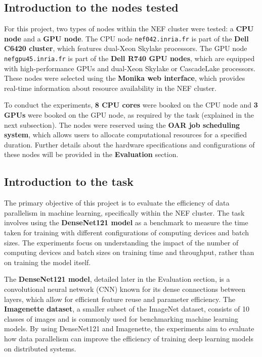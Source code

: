 \documentclass{article}
\begin{document}
\subsection{Introduction to the nodes tested}
For this project, two types of nodes within the NEF cluster were tested: a \textbf{CPU node} and a \textbf{GPU node}. The CPU node \texttt{nef042.inria.fr} is part of the \textbf{Dell C6420 cluster}, which features dual-Xeon Skylake processors. The GPU node \texttt{nefgpu45.inria.fr} is part of the \textbf{Dell R740 GPU nodes}, which are equipped with high-performance GPUs and dual-Xeon Skylake or CascadeLake processors. These nodes were selected using the \textbf{Monika web interface}, which provides real-time information about resource availability in the NEF cluster.

To conduct the experiments, \textbf{8 CPU cores} were booked on the CPU node and \textbf{3 GPUs} were booked on the GPU node, as required by the task (explained in the next subsection). The nodes were reserved using the \textbf{OAR job scheduling system}, which allows users to allocate computational resources for a specified duration. Further details about the hardware specifications and configurations of these nodes will be provided in the \textbf{Evaluation} section.

\subsection{Introduction to the task}
The primary objective of this project is to evaluate the efficiency of data parallelism in machine learning, specifically within the NEF cluster. The task involves using the \textbf{DenseNet121 model} as a benchmark to measure the time taken for training with different configurations of computing devices and batch sizes. The experiments focus on understanding the impact of the number of computing devices and batch sizes on training time and throughput, rather than on training the model itself.

The \textbf{DenseNet121 model}, detailed later in the Evaluation section, is a convolutional neural network (CNN) known for its dense connections between layers, which allow for efficient feature reuse and parameter efficiency. The \textbf{Imagenette dataset}, a smaller subset of the ImageNet dataset, consists of 10 classes of images and is commonly used for benchmarking machine learning models. By using DenseNet121 and Imagenette, the experiments aim to evaluate how data parallelism can improve the efficiency of training deep learning models on distributed systems.
\end{document}
